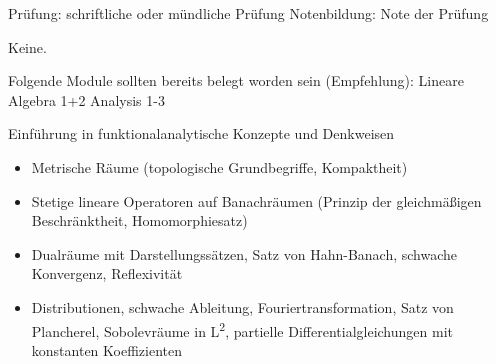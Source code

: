 \begin{course}

\setdoclanguagegerman
{}


\courselevel{}
\courseinstructionlanguage{}

\coursehead


\label{cour_7763.dp_997}


\begin{styleenv}
\begin{assessment}
Prüfung: schriftliche oder mündliche Prüfung\newline
Notenbildung: Note der Prüfung


\end{assessment}

\begin{conditions}Keine.\end{conditions}

\begin{recommendations}Folgende Module sollten bereits belegt worden sein (Empfehlung):\newline
Lineare Algebra 1+2\newline
Analysis 1-3

\end{recommendations}
\end{styleenv}

\begin{learningoutcomes}
Einführung in funktionalanalytische Konzepte und Denkweisen


\end{learningoutcomes}

\begin{content}
\begin{itemize}\item Metrische Räume (topologische Grundbegriffe, Kompaktheit)  \item Stetige lineare Operatoren auf Banachräumen (Prinzip der gleichmäßigen Beschränktheit, Homomorphiesatz)  \item Dualräume mit Darstellungssätzen, Satz von Hahn-Banach, schwache Konvergenz, Reflexivität  \item Distributionen, schwache Ableitung, Fouriertransformation, Satz von Plancherel, Sobolevräume in L\textsuperscript{2}, partielle Differentialgleichungen mit konstanten Koeffizienten  \end{itemize}
\end{content}







\end{course}